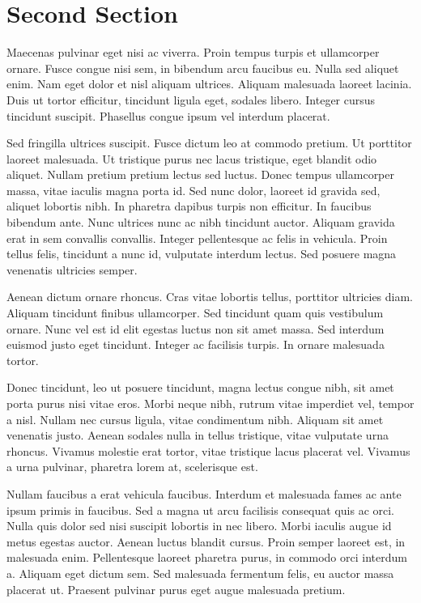 \documentclass{article}
\begin{document}
	\section{Second Section}
	
	Maecenas pulvinar eget nisi ac viverra. Proin tempus turpis et ullamcorper ornare. Fusce congue nisi sem, in bibendum arcu faucibus eu. Nulla sed aliquet enim. Nam eget dolor et nisl aliquam ultrices. Aliquam malesuada laoreet lacinia. Duis ut tortor efficitur, tincidunt ligula eget, sodales libero. Integer cursus tincidunt suscipit. Phasellus congue ipsum vel interdum placerat.
	
	Sed fringilla ultrices suscipit. Fusce dictum leo at commodo pretium. Ut porttitor laoreet malesuada. Ut tristique purus nec lacus tristique, eget blandit odio aliquet. Nullam pretium pretium lectus sed luctus. Donec tempus ullamcorper massa, vitae iaculis magna porta id. Sed nunc dolor, laoreet id gravida sed, aliquet lobortis nibh. In pharetra dapibus turpis non efficitur. In faucibus bibendum ante. Nunc ultrices nunc ac nibh tincidunt auctor. Aliquam gravida erat in sem convallis convallis. Integer pellentesque ac felis in vehicula. Proin tellus felis, tincidunt a nunc id, vulputate interdum lectus. Sed posuere magna venenatis ultricies semper.
	
	Aenean dictum ornare rhoncus. Cras vitae lobortis tellus, porttitor ultricies diam. Aliquam tincidunt finibus ullamcorper. Sed tincidunt quam quis vestibulum ornare. Nunc vel est id elit egestas luctus non sit amet massa. Sed interdum euismod justo eget tincidunt. Integer ac facilisis turpis. In ornare malesuada tortor.
	
	Donec tincidunt, leo ut posuere tincidunt, magna lectus congue nibh, sit amet porta purus nisi vitae eros. Morbi neque nibh, rutrum vitae imperdiet vel, tempor a nisl. Nullam nec cursus ligula, vitae condimentum nibh. Aliquam sit amet venenatis justo. Aenean sodales nulla in tellus tristique, vitae vulputate urna rhoncus. Vivamus molestie erat tortor, vitae tristique lacus placerat vel. Vivamus a urna pulvinar, pharetra lorem at, scelerisque est.
	
	Nullam faucibus a erat vehicula faucibus. Interdum et malesuada fames ac ante ipsum primis in faucibus. Sed a magna ut arcu facilisis consequat quis ac orci. Nulla quis dolor sed nisi suscipit lobortis in nec libero. Morbi iaculis augue id metus egestas auctor. Aenean luctus blandit cursus. Proin semper laoreet est, in malesuada enim. Pellentesque laoreet pharetra purus, in commodo orci interdum a. Aliquam eget dictum sem. Sed malesuada fermentum felis, eu auctor massa placerat ut. Praesent pulvinar purus eget augue malesuada pretium.
\end{document}
